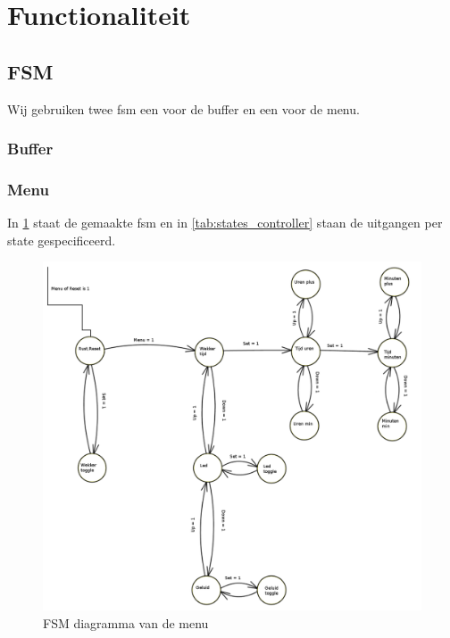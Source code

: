 \section{Functionaliteit}

\subsection{FSM}
Wij gebruiken twee fsm een voor de buffer en een voor de menu.
\subsubsection{Buffer}


\subsubsection{Menu}
In \cref{fig:FSM_controller} staat de gemaakte fsm en in \cref{tab:states_controller} staan de uitgangen per state gespecificeerd.

\begin{figure}[ht!]
\includegraphics[width=\textwidth,height=\textheight,keepaspectratio]{FSM/controller_fsm.png}
\caption{FSM diagramma van de menu}
\label{fig:FSM_controller}
\end{figure}


